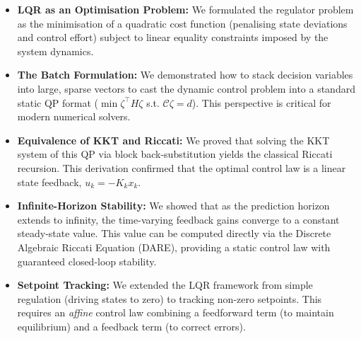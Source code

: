 \begin{itemize}
	\item \textbf{LQR as an Optimisation Problem:} We formulated the regulator problem as the minimisation of a quadratic cost function (penalising state deviations and control effort) subject to linear equality constraints imposed by the system dynamics.
	
	\item \textbf{The Batch Formulation:} We demonstrated how to stack decision variables into large, sparse vectors to cast the dynamic control problem into a standard static QP format ($\min \zeta^\top H \zeta$ s.t. $\mathcal{C}\zeta=d$). This perspective is critical for modern numerical solvers.
	
	\item \textbf{Equivalence of KKT and Riccati:} We proved that solving the KKT system of this QP via block back-substitution yields the classical Riccati recursion. This derivation confirmed that the optimal control law is a linear state feedback, $u_k = -K_k x_k$.
	
	\item \textbf{Infinite-Horizon Stability:} We showed that as the prediction horizon extends to infinity, the time-varying feedback gains converge to a constant steady-state value. This value can be computed directly via the Discrete Algebraic Riccati Equation (DARE), providing a static control law with guaranteed closed-loop stability.
	
	\item \textbf{Setpoint Tracking:} We extended the LQR framework from simple regulation (driving states to zero) to tracking non-zero setpoints. This requires an \textit{affine} control law combining a feedforward term (to maintain equilibrium) and a feedback term (to correct errors).
\end{itemize}


